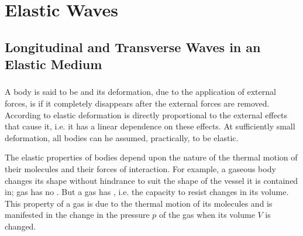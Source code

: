 





\chapter{Elastic Waves}
\label{ch-30}

\section[Waves in an Elastic Medium]{Longitudinal and Transverse Waves in an Elastic Medium}
\label{sec-30.1} 

\subsection{}\label{30.1.1} A body is said to be  and its deformation, due to the application of external forces, is  if it completely disappears after the external forces are removed. According to  elastic deformation is directly proportional to the external effects that cause it, i.e. it has a linear dependence on these effects. At sufficiently small deformation, all bodies can he assumed, practically, to be elastic.

The elastic properties of bodies depend upon the nature of the thermal
motion of their molecules and their forces of interaction. For
example, a gaseous body changes its shape without hindrance to suit
the shape of the vessel it is contained in; gas has no . But a gas has , i.e. the capacity to resist
changes in its volume. This property of a gas is due to the thermal
motion of its molecules and is manifested in the change in the
pressure $p$ of the gas when its volume $V$ is changed.

